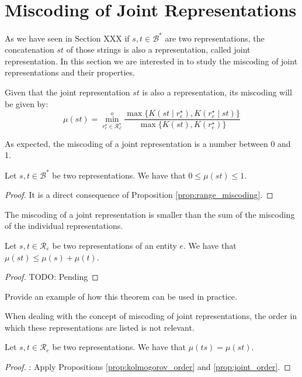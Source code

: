 %
%
\section{Miscoding of Joint Representations}
\label{sec:joint_miscoding}

As we have seen in Section {\color{red} XXX} if $s, t \in \mathcal{B}^\ast$ are two representations, the concatenation $st$ of those strings is also a representation, called joint representation. In this section we are interested in to study the miscoding of joint representations and their properties.

Given that the joint representation $st$ is also a representation, its miscoding will be given by:
\[
\mu(st) = \overset{o}{ \underset{ r^\star_e \in \mathcal{R}^\star_\mathcal{E} } \min} \frac{ \max\{ K \left( st \mid r^\star_e \right), K \left( r^\star_e \mid st \right) \} } { \max\{ K \left( st \right), K \left( r^\star_e \right) \} }
\]

As expected, the miscoding of a joint representation is a number between 0 and 1.

\begin{proposition}
Let $s, t \in \mathcal{B}^\ast$ be two representations. We have that $0 \leq \mu(st) \leq 1$.
\end{proposition}
\begin{proof}
It is a direct consequence of Proposition \ref{prop:range_miscoding}.
\end{proof}

The miscoding of a joint representation is smaller than the sum of the miscoding of the individual representations.

\begin{proposition}
Let $s, t \in \mathcal{R}_e$ be two representations of an entity $e$. We have that $\mu( st ) \leq \mu(s) + \mu(t)$.
\end{proposition}
\begin{proof}
{\color{red} TODO: Pending}
\end{proof}

\begin{example}
{\color{red} Provide an example of how this theorem can be used in practice.}
\end{example}

When dealing with the concept of miscoding of joint representations, the order in which these representations are listed is not relevant.

\begin{proposition}
Let $s, t \in \mathcal{R}_e$ be two representations. We have that $\mu(ts) = \mu(st)$.
\end{proposition}
\begin{proof}
{\color{red}: Apply Propositions \ref{prop:kolmogorov_order} and \ref{prop:joint_order}.}
\end{proof}

